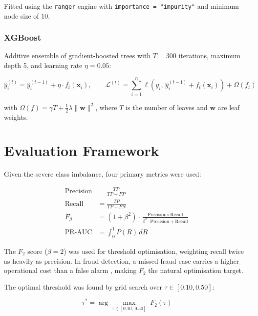 \documentclass[12pt, a4paper]{article}
\begin{document}
Fitted using the \texttt{ranger} engine with \texttt{importance = "impurity"} and
minimum node size of 10.

\subsubsection{XGBoost}

Additive ensemble of gradient-boosted trees \cite{chen2016} with $T = 300$
iterations, maximum depth 5, and learning rate $\eta = 0.05$:

\begin{equation}
    \hat{y}_i^{(t)} = \hat{y}_i^{(t-1)} + \eta \cdot f_t(\mathbf{x}_i),
    \qquad
    \mathcal{L}^{(t)} = \sum_{i=1}^{n}
    \ell\!\left(y_i,\, \hat{y}_i^{(t-1)} + f_t(\mathbf{x}_i)\right) + \Omega(f_t)
\end{equation}

with $\Omega(f) = \gamma T + \frac{1}{2}\lambda \|\mathbf{w}\|^2$, where $T$ is
the number of leaves and $\mathbf{w}$ are leaf weights.

\section{Evaluation Framework}

Given the severe class imbalance, four primary metrics were used:

\begin{align}
    \text{Precision} &= \frac{TP}{TP + FP} \\[4pt]
    \text{Recall}    &= \frac{TP}{TP + FN} \\[4pt]
    F_\beta          &= (1+\beta^2)\cdot
                        \frac{\text{Precision} \times \text{Recall}}
                        {\beta^2 \cdot \text{Precision} + \text{Recall}} \\[4pt]
    \text{PR-AUC}    &= \int_0^1 P(R)\,dR
\end{align}

The $F_2$ score ($\beta = 2$) was used for threshold optimisation, weighting recall
twice as heavily as precision. In fraud detection, a missed fraud case carries a
higher operational cost than a false alarm \cite{vanVlasselaer2015}, making $F_2$
the natural optimisation target.

The optimal threshold was found by grid search over $\tau \in [0.10, 0.50]$:

\begin{equation}
    \tau^* = \arg\max_{\tau \in [0.10,\, 0.50]}\; F_2(\tau)
\end{equation}
\end{document}
